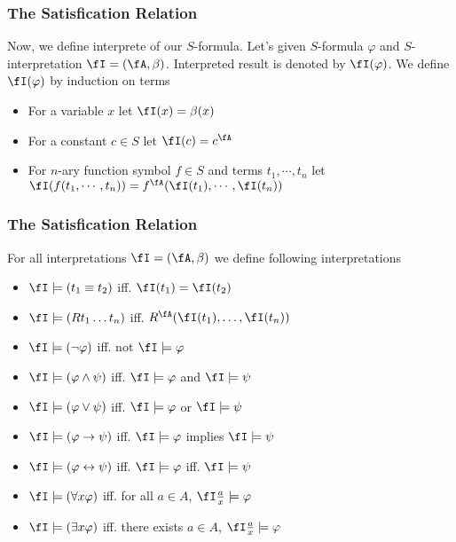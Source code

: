 \begin{frame}
    \frametitle{The Satisfication Relation}

    Now, we define interprete of our $S$-formula.
    Let's given $S$-formula $\varphi$ and $S$-interpretation $\fI = (\fA, \beta)$.
    Interpreted result is denoted by $\fI(\varphi)$.
    We define $\fI(\varphi)$ by induction on terms
    
    \begin{definition}
        \begin{itemize}
            \item For a variable $x$ let $\fI(x) = \beta(x)$
            \item For a constant $c \in S$ let $\fI(c) = c^{\fA}$
            \item For $n$-ary function symbol $f \in S$ and terms $t_1, \cdots, t_n$ let $\fI(f(t_1, \cdots, t_n)) = f^{\fA}(\fI(t_1), \cdots, \fI(t_n))$
        \end{itemize}
    \end{definition}

\end{frame}

\begin{frame}
    \frametitle{The Satisfication Relation}

    For all interpretations $\fI = (\fA, \beta)$ we define following interpretations

    \begin{itemize}
        \item $\fI \models (t_1 \equiv t_2)$ iff. $\fI(t_1) = \fI(t_2)$
        \item $\fI \models (R t_1 \ldots t_n)$ iff. $R^{\fA}(\fI(t_1), \ldots, \fI(t_n))$
        \item $\fI \models (\neg \varphi)$ iff. not $\fI \models \varphi$
        \item $\fI \models (\varphi \wedge \psi)$ iff. $\fI \models \varphi$ and $\fI \models \psi$
        \item $\fI \models (\varphi \vee \psi)$ iff. $\fI \models \varphi$ or $\fI \models \psi$
        \item $\fI \models (\varphi \to \psi)$ iff. $\fI \models \varphi$ implies $\fI \models \psi$
        \item $\fI \models (\varphi \leftrightarrow \psi)$ iff. $\fI \models \varphi$ iff. $\fI \models \psi$
        \item $\fI \models (\forall x \varphi)$ iff. for all $a \in A$, $\fI \frac{a}{x} \models \varphi$
        \item $\fI \models (\exists x \varphi)$ iff. there exists $a \in A$, $\fI \frac{a}{x} \models \varphi$
    \end{itemize}
    
\end{frame}


